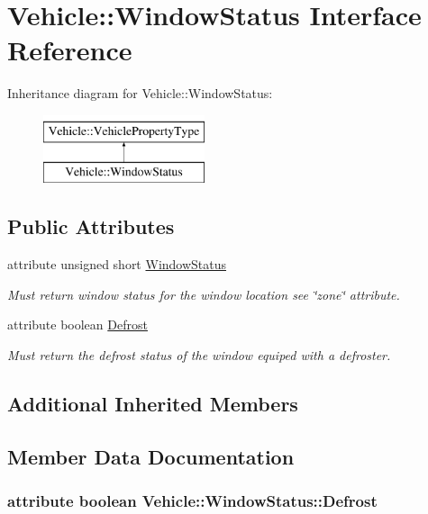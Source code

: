 \hypertarget{interfaceVehicle_1_1WindowStatus}{\section{Vehicle\-:\-:Window\-Status Interface Reference}
\label{interfaceVehicle_1_1WindowStatus}
}
Inheritance diagram for Vehicle\-:\-:Window\-Status\-:\begin{figure}[H]
\begin{center}
\leavevmode
\includegraphics[height=2.000000cm]{interfaceVehicle_1_1WindowStatus}
\end{center}
\end{figure}
\subsection*{Public Attributes}
\begin{DoxyCompactItemize}
\item 
attribute unsigned short \hyperlink{interfaceVehicle_1_1WindowStatus_a8838fdb02764a348229724082a168910}{Window\-Status}
\begin{DoxyCompactList}\small\item\em Must return window status for the window location see \char`\"{}zone\char`\"{} attribute. \end{DoxyCompactList}\item 
attribute boolean \hyperlink{interfaceVehicle_1_1WindowStatus_a2d3449f1864c83d61740514cabc244de}{Defrost}
\begin{DoxyCompactList}\small\item\em Must return the defrost status of the window equiped with a defroster. \end{DoxyCompactList}\end{DoxyCompactItemize}
\subsection*{Additional Inherited Members}


\subsection{Member Data Documentation}
\hypertarget{interfaceVehicle_1_1WindowStatus_a2d3449f1864c83d61740514cabc244de}{
\subsubsection[{Defrost}]{\setlength{\rightskip}{0pt plus 5cm}attribute boolean Vehicle\-::\-Window\-Status\-::\-Defrost}}\label{interfaceVehicle_1_1WindowStatus_a2d3449f1864c83d61740514cabc244de}


